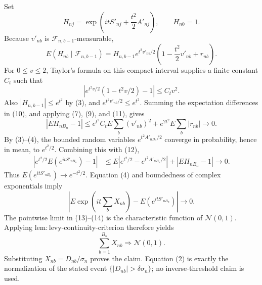 Set
\[
H_{nj}=\exp\!\left(itS'_{nj}+\frac{t^2}{2}A'_{nj}\right),
\qquad H_{n0}=1.
\]
Because \(v'_{nb}\) is \(\mathcal F_{n,b-1}\)-measurable,
\[
E(H_{nb}\mid\mathcal F_{n,b-1})
=H_{n,b-1}e^{t^2v'_{nb}/2}
\left(1-\frac{t^2}{2}v'_{nb}+r_{nb}\right).
\tag{10}
\]
For \(0\le v\le2\), Taylor's formula on this compact interval supplies a finite constant \(C_t\) such that
\[
\left|e^{t^2v/2}(1-t^2v/2)-1\right|\le C_tv^2.
\tag{11}
\]
Also \(|H_{n,b-1}|\le e^{t^2}\) by (3), and \(e^{t^2v'_{nb}/2}\le e^{t^2}\). Summing the expectation differences in (10), and applying (7), (9), and (11), gives
\[
|EH_{nB_n}-1|
\le e^{t^2}C_tE\sum_b(v'_{nb})^2
+e^{2t^2}E\sum_b|r_{nb}|
\longrightarrow0.
\tag{12}
\]
By (3)--(4), the bounded random variables \(e^{t^2A'_{nB_n}/2}\) converge in probability, hence in mean, to \(e^{t^2/2}\). Combining this with (12),
\[
\begin{aligned}
\left|e^{t^2/2}E(e^{itS'_{nB_n}})-1\right|
&\le E\left|e^{t^2/2}-e^{t^2A'_{nB_n}/2}\right|
+|EH_{nB_n}-1|\longrightarrow0.
\end{aligned}
\tag{13}
\]
Thus \(E(e^{itS'_{nB_n}})\to e^{-t^2/2}\). Equation (4) and boundedness of complex exponentials imply
\[
\left|E\exp\!\left(it\sum_bX_{nb}\right)-E(e^{itS'_{nB_n}})\right|\longrightarrow0.
\tag{14}
\]
The pointwise limit in (13)--(14) is the characteristic function of \(\mathcal N(0,1)\). Applying \(\mathrm{lem:levy\text{-}continuity\text{-}criterion}\) therefore yields
\[
\sum_{b=1}^{B_n}X_{nb}\Rightarrow\mathcal N(0,1).
\]
Substituting \(X_{nb}=D_{nb}/\sigma_n\) proves the claim. Equation (2) is exactly the normalization of the stated event \(\{|D_{nb}|>\delta\sigma_n\}\); no inverse-threshold claim is used.